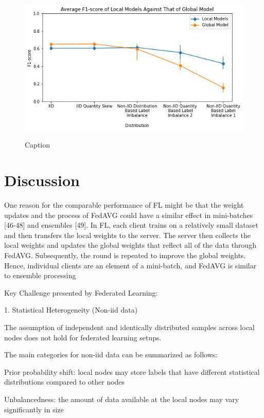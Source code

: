 \documentclass[letterpaper]{article} %
\begin{document}
\begin{figure}[h]
{\includegraphics[width=\columnwidth]{Avg_f1_score_of_local_models_against_that_of_global_model}}
\caption{Caption}
\end{figure}

\bigskip
\section{Discussion}

One reason for the comparable performance of FL might be that
the weight updates and the process of FedAVG could have a similar effect in mini-batches [46-48] and ensembles [49]. In FL, each client trains on a relatively small dataset and then
transfers the local weights to the server. The server then collects
the local weights and updates the global weights that reflect all
of the data through FedAVG. Subsequently, the round is
repeated to improve the global weights. Hence, individual clients
are an element of a mini-batch, and FedAVG is similar to
ensemble processing

Key Challenge presented by Federated Learning:

1.	Statistical Heterogeneity (Non-iid data)

The assumption of independent and identically distributed samples across local nodes does not hold for federated learning setups.

The main categories for non-iid data can be summarized as follows:

Prior probability shift: local nodes may store labels that have different statistical distributions compared to other nodes

Unbalancedness: the amount of data available at the local nodes may vary significantly in size
\end{document}
